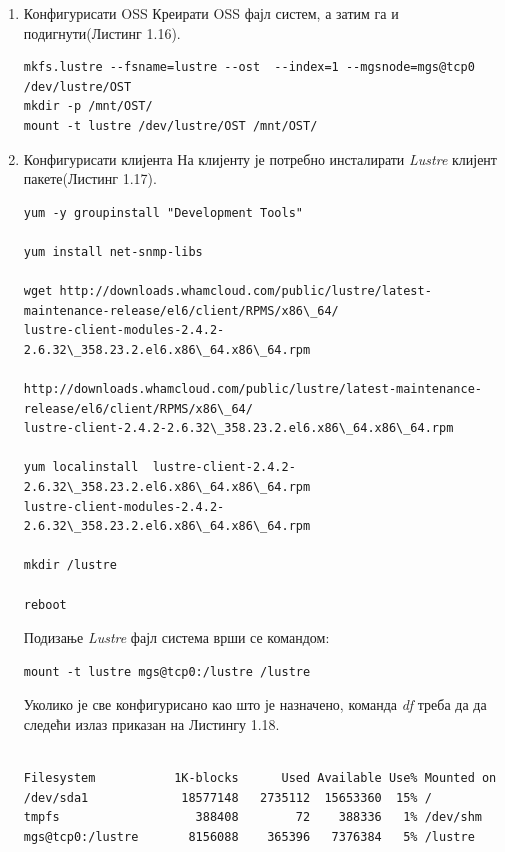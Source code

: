 \begin{enumerate}
\item Конфигурисати OSS 
Креирати OSS фајл систем, а затим га и подигнути(Листинг 1.16).
\begin{lstlisting}[style=nonumbers,frame=single, caption=Креирање OSS фајл систем]
mkfs.lustre --fsname=lustre --ost  --index=1 --mgsnode=mgs@tcp0 /dev/lustre/OST 
mkdir -p /mnt/OST/
mount -t lustre /dev/lustre/OST /mnt/OST/ 
\end{lstlisting}


\item Конфигурисати клијента 
На клијенту је потребно инсталирати \textit{Lustre} клијент пакете(Листинг 1.17). 
\begin{lstlisting}[style=nonumbers,frame=single, caption= Команде за инсталацију \textit{Lustre} клијент пакета]
yum -y groupinstall "Development Tools"

yum install net-snmp-libs

wget http://downloads.whamcloud.com/public/lustre/latest-maintenance-release/el6/client/RPMS/x86\_64/
lustre-client-modules-2.4.2-2.6.32\_358.23.2.el6.x86\_64.x86\_64.rpm

http://downloads.whamcloud.com/public/lustre/latest-maintenance-release/el6/client/RPMS/x86\_64/
lustre-client-2.4.2-2.6.32\_358.23.2.el6.x86\_64.x86\_64.rpm

yum localinstall  lustre-client-2.4.2-2.6.32\_358.23.2.el6.x86\_64.x86\_64.rpm 
lustre-client-modules-2.4.2-2.6.32\_358.23.2.el6.x86\_64.x86\_64.rpm 

mkdir /lustre

reboot
\end{lstlisting}


Подизање   \textit{Lustre} фајл система врши се командом:
\begin{verbatim}
mount -t lustre mgs@tcp0:/lustre /lustre
\end{verbatim}

Уколико је све конфигурисано као што је назначено, команда  \textit{df} треба да да следећи излаз приказан на Листингу 1.18.
\begin{lstlisting}[style=nonumbers,frame=single, caption= Излаз команде \textit{df}]

Filesystem           1K-blocks      Used Available Use% Mounted on
/dev/sda1             18577148   2735112  15653360  15% /
tmpfs                   388408        72    388336   1% /dev/shm
mgs@tcp0:/lustre       8156088    365396   7376384   5% /lustre

\end{lstlisting}

\end{enumerate}


